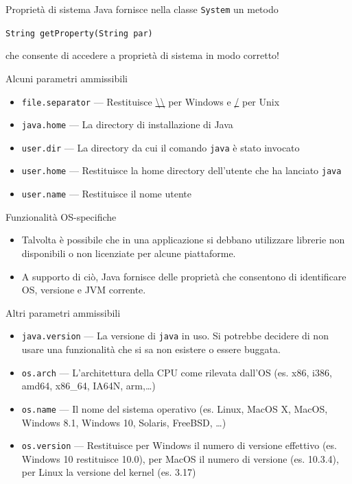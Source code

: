 \documentclass[presentation]{beamer}
\begin{document}
\begin{frame}{Proprietà di sistema}
Java fornisce nella classe \texttt{System} un metodo\\
\begin{center}
{\Large \texttt{String getProperty(String par)}}
\end{center}
che consente di accedere a proprietà di sistema in modo corretto!
\vspace{10pt}
\begin{block}{Alcuni parametri ammissibili}
\begin{itemize}
\item \texttt{file.separator} --- Restituisce \url{\\} per Windows e \url{/} per Unix
\item \texttt{java.home} --- La directory di installazione di Java
\item \texttt{user.dir} --- La directory da cui il comando \texttt{java} è stato invocato
\item \texttt{user.home} --- Restituisce la home directory dell'utente che ha lanciato \texttt{java}
\item \texttt{user.name} --- Restituisce il nome utente
\end{itemize}
\end{block}
\end{frame}

\begin{frame}{Funzionalità OS-specifiche}
\begin{itemize}\itemsep10pt
\item Talvolta è possibile che in una applicazione si debbano utilizzare librerie non disponibili o non licenziate per alcune piattaforme.
\item A supporto di ciò, Java fornisce delle proprietà che consentono di identificare OS, versione e JVM corrente.
\end{itemize}

\begin{block}{Altri parametri ammissibili}
\begin{itemize}
\item \texttt{java.version} --- La versione di \texttt{java} in uso. Si potrebbe decidere di non usare una funzionalità che si sa non esistere o essere buggata.

\item \texttt{os.arch} --- L'architettura della CPU come rilevata dall'OS (es. x86, i386, amd64, x86\_64, IA64N, arm,\dots)

\item \texttt{os.name} --- Il nome del sistema operativo (es. Linux, MacOS X, MacOS, Windows 8.1, Windows 10, Solaris, FreeBSD, \dots)

\item \texttt{os.version} --- Restituisce per Windows il numero di versione effettivo (es. Windows 10 restituisce 10.0), per MacOS il numero di versione (es. 10.3.4), per Linux la versione del kernel (es. 3.17)
\end{itemize}
\end{block}

\end{frame}
\end{document}
